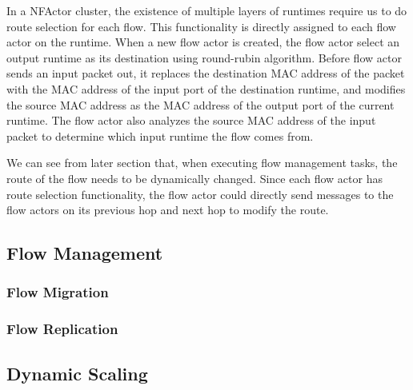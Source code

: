 In a NFActor cluster, the existence of multiple layers of runtimes require us to do route selection for each flow. This functionality is directly assigned to each flow actor on the runtime. When a new flow actor is created, the flow actor select an output runtime as its destination using round-rubin algorithm. Before flow actor sends an input packet out, it replaces the destination MAC address of the packet with the MAC address of the input port of the destination runtime, and modifies the source MAC address as the MAC address of the output port of the current runtime. The flow actor also analyzes the source MAC address of the input packet to determine which input runtime the flow comes from.

We can see from later section that, when executing flow management tasks, the route of the flow needs to be dynamically changed. Since each flow actor has route selection functionality, the flow actor could directly send messages to the flow actors on its previous hop and next hop to modify the route.   



\subsection{Flow Management}
\subsubsection{Flow Migration}
\subsubsection{Flow Replication}

\subsection{Dynamic Scaling}

